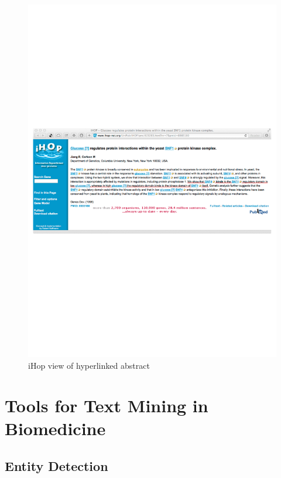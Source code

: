 \begin{figure}
\begin{center}
\includegraphics[scale=0.6]{figures/ihop-3.pdf}
 \caption{iHop view of hyperlinked abstract}
\label{fig:ihop-3}
\end{center}
\end{figure}



\section{Tools for Text Mining in Biomedicine}
\label{sec:tools-tm}

\subsection{Entity Detection}

